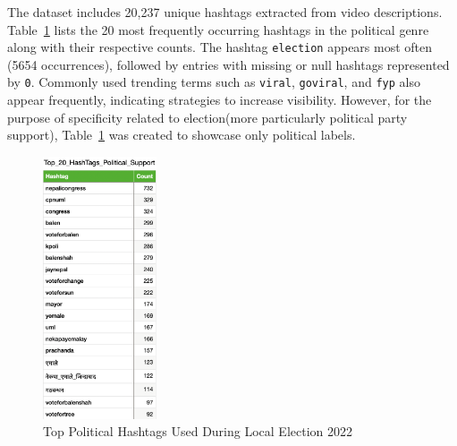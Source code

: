 \documentclass[12pt,a4paper]{report}
\begin{document}
The dataset includes 20,237 unique hashtags extracted from video descriptions. Table~\ref{fig:top_political_hashtag} lists the 20 most frequently occurring hashtags in the political genre along with their respective counts. The hashtag \texttt{election} appears most often (5654 occurrences), followed by entries with missing or null hashtags represented by \texttt{0}. Commonly used trending terms such as \texttt{viral}, \texttt{goviral}, and \texttt{fyp} also appear frequently, indicating strategies to increase visibility. However, for the purpose of specificity related to election(more particularly political party support), Table~\ref{fig:top_political_hashtag} was created to showcase only political labels. 

\begin{figure}[htbp]
    \centering
    \includegraphics[width=0.30\textwidth]{figures/EDA/Top_20_Political_Hashtag.png}
    \caption{Top Political Hashtags Used During Local Election 2022}
    \label{fig:top_political_hashtag}
\end{figure}



\clearpage
\end{document}
